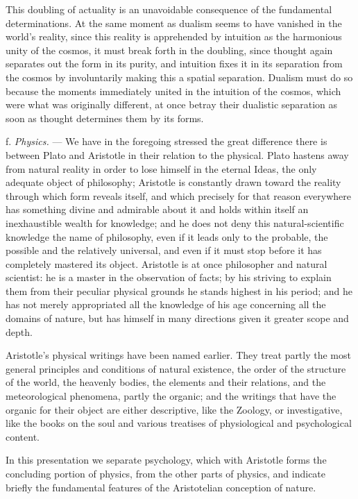 This doubling of actuality is an unavoidable consequence of the
fundamental determinations. At the same moment as dualism seems to have
vanished in the world's reality, since this reality is apprehended by
intuition as the harmonious unity of the cosmos, it must break
forth in the doubling, since thought again separates out the form in its
purity, and intuition fixes it in its separation from the cosmos by
involuntarily making this a spatial separation. Dualism must do so
because the moments immediately united in the intuition of the cosmos,
which were what was originally different, at once betray their
dualistic separation as soon as thought determines them by its forms.

\divrule

f. \emph{Physics.} --- We have in the foregoing stressed the great
difference there is between Plato and Aristotle in their relation to
the physical. Plato hastens away from natural reality in order to lose
himself in the eternal Ideas, the only adequate object of philosophy;
Aristotle is constantly drawn toward the reality through which form
reveals itself, and which precisely for that reason everywhere has
something divine and admirable about it and holds within itself an
inexhaustible wealth for knowledge; and he does not deny this
natural-scientific knowledge the name of philosophy, even if it leads
only to the probable, the possible and the relatively universal, and
even if it must stop before it has completely mastered its object.
Aristotle is at once philosopher and natural scientist: he is a master
in the observation of facts; by his striving to explain them from their
peculiar physical grounds he stands highest in his period; and he has
not merely appropriated all the knowledge of his age concerning all
the domains of nature, but has himself in many directions given it
greater scope and depth.

Aristotle's physical writings have been named earlier. They treat
partly the most general principles and conditions of natural
existence, the order of the structure of the world, the heavenly
bodies, the elements and their relations, and the meteorological
phenomena, partly the organic; and the writings that have the organic
for their object are either descriptive, like the
Zoology, or investigative, like the books on the soul and
various treatises of physiological and psychological content.

In this presentation we separate psychology, which with Aristotle
forms the concluding portion of physics, from the other parts of
physics, and indicate briefly the fundamental features of the
Aristotelian conception of nature.

